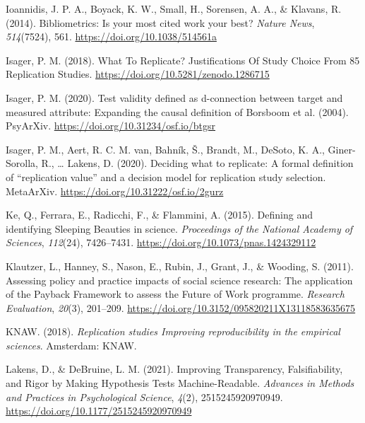 \documentclass[
  english,
  man,floatsintext]{apa6}
\newlength{\cslhangindent}
\newlength{\cslentryspacingunit} %
\newenvironment{CSLReferences}[2] %
 {%
  \setlength{\parindent}{0pt}
  \ifodd #1
  \let\oldpar\par
  \def\par{\hangindent=\cslhangindent\oldpar}
  \fi
  \setlength{\parskip}{#2\cslentryspacingunit}
 }%
 {}
\begin{document}
\begin{CSLReferences}{1}{0}
\leavevmode{}%
Ioannidis, J. P. A., Boyack, K. W., Small, H., Sorensen, A. A., \& Klavans, R. (2014). Bibliometrics: {Is} your most cited work your best? \emph{Nature News}, \emph{514}(7524), 561. \url{https://doi.org/10.1038/514561a}

\leavevmode{}%
Isager, P. M. (2018). What {To Replicate}? {Justifications Of Study Choice From} 85 {Replication Studies}. \url{https://doi.org/10.5281/zenodo.1286715}

\leavevmode{}%
Isager, P. M. (2020). Test validity defined as d-connection between target and measured attribute: {Expanding} the causal definition of {Borsboom} et al. (2004). {PsyArXiv}. \url{https://doi.org/10.31234/osf.io/btgsr}

\leavevmode{}%
Isager, P. M., Aert, R. C. M. van, Bahník, Š., Brandt, M., DeSoto, K. A., Giner-Sorolla, R., \ldots{} Lakens, D. (2020). Deciding what to replicate: {A} formal definition of {``replication value''} and a decision model for replication study selection. {MetaArXiv}. \url{https://doi.org/10.31222/osf.io/2gurz}

\leavevmode{}%
Ke, Q., Ferrara, E., Radicchi, F., \& Flammini, A. (2015). Defining and identifying {Sleeping Beauties} in science. \emph{Proceedings of the National Academy of Sciences}, \emph{112}(24), 7426--7431. \url{https://doi.org/10.1073/pnas.1424329112}

\leavevmode{}%
Klautzer, L., Hanney, S., Nason, E., Rubin, J., Grant, J., \& Wooding, S. (2011). Assessing policy and practice impacts of social science research: The application of the {Payback Framework} to assess the {Future} of {Work} programme. \emph{Research Evaluation}, \emph{20}(3), 201--209. \url{https://doi.org/10.3152/095820211X13118583635675}

\leavevmode{}%
KNAW. (2018). \emph{Replication studies \textendash{} {Improving} reproducibility in the empirical sciences}. {Amsterdam}: {KNAW}.

\leavevmode{}%
Lakens, D., \& DeBruine, L. M. (2021). Improving {Transparency}, {Falsifiability}, and {Rigor} by {Making Hypothesis Tests Machine}-{Readable}. \emph{Advances in Methods and Practices in Psychological Science}, \emph{4}(2), 2515245920970949. \url{https://doi.org/10.1177/2515245920970949}


\end{CSLReferences}
\end{document}
